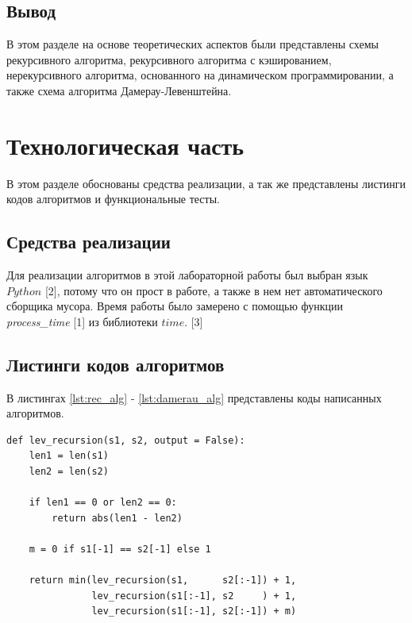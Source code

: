 \documentclass{article}
\begin{document}
\clearpage\subsection{Вывод}
В этом разделе на основе теоретических аспектов были представлены схемы рекурсивного алгоритма, рекурсивного алгоритма
с кэшированием, нерекурсивного алгоритма, основанного на динамическом программировании, а также схема алгоритма
Дамерау-Левенштейна.


\clearpage\section{Технологическая часть}
В этом разделе обоснованы средства реализации, а так же представлены листинги кодов алгоритмов и функциональные тесты.

\subsection{Средства реализации}
Для реализации алгоритмов в этой лабораторной работы был выбран язык $Python$ [2], потому что он прост в
работе, а также в нем нет автоматического сборщика мусора. Время работы было замерено с помощью функции
\textit{process\_time} [1] из библиотеки $time$. [3]

\subsection{Листинги кодов алгоритмов}
В листингах \ref{lst:rec_alg} - \ref{lst:damerau_alg} представлены коды написанных алгоритмов.

\begin{lstlisting}[style=python, label=lst:rec_alg,caption=Рекурсивный алгоритм]
def lev_recursion(s1, s2, output = False):
    len1 = len(s1)
    len2 = len(s2)

    if len1 == 0 or len2 == 0:
        return abs(len1 - len2)

    m = 0 if s1[-1] == s2[-1] else 1

    return min(lev_recursion(s1,      s2[:-1]) + 1,
               lev_recursion(s1[:-1], s2     ) + 1,
               lev_recursion(s1[:-1], s2[:-1]) + m)
\end{lstlisting}
\end{document}
